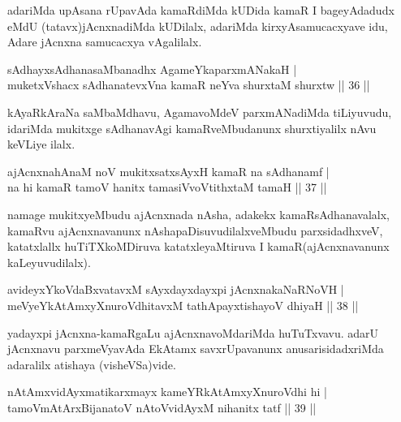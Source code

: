 \begin{artha}
adariMda upAsana rUpavAda kamaRdiMda kUDida kamaR I bageyAdadudx eMdU (tatavx)jAcnxnadiMda kUDilalx, adariMda kirxyAsamucacxyave idu, Adare jAcnxna samucacxya vAgalilalx.
\end{artha}


\begin{shl}
sAdhayxsAdhanasaMbanadhx AgameYkaparxmANakaH |\\
muketxVshacx sAdhanatevxVna kamaR neYva shurxtaM shurxtw \hfill || 36 ||
\end{shl}

\begin{artha}
kAyaRkAraNa saMbaMdhavu, AgamavoMdeV parxmANadiMda tiLiyuvudu, idariMda mukitxge sAdhanavAgi kamaRveMbudanunx shurxtiyalilx nAvu keVLiye ilalx.
\end{artha}


\begin{shl}
ajAcnxnahAnaM noV mukitxsatxsAyxH kamaR na sAdhanamf |\\
na hi kamaR tamoV hanitx tamasiVvoVtithxtaM tamaH \hfill || 37 ||
\end{shl}

\begin{artha}
namage mukitxyeMbudu ajAcnxnada nAsha, adakekx kamaRsAdhanavalalx, kamaRvu ajAcnxnavanunx nAshapaDisuvudilalxveMbudu parxsidadhxveV, katatxlallx huTiTXkoMDiruva katatxleyaMtiruva I kamaR(ajAcnxnavanunx kaLeyuvudilalx).
\end{artha}


\begin{shl}
avideyxYkoVdaBxvatavxM sAyxdayxdayxpi jAcnxnakaNaRNoVH |\\
meVyeYkAtAmxyXnuroVdhitavxM tathA\s payxtishayoV dhiyaH \hfill || 38 ||
\end{shl}

\begin{artha}
yadayxpi jAcnxna-kamaRgaLu ajAcnxnavoMdariMda huTuTxvavu. adarU jAcnxnavu parxmeVyavAda EkAtamx savxrUpavanunx anusarisidadxriMda adaralilx atishaya (visheVSa)vide.
\end{artha}

\begin{shl}
nA\s \s tAmxvidAyxmatikarxmayx kameYRkAtAmxyXnuroVdhi hi |\\
tamoVmAtArxBijanatoV nAtoV\s vidAyxM nihanitx tatf \hfill || 39 ||
\end{shl}

